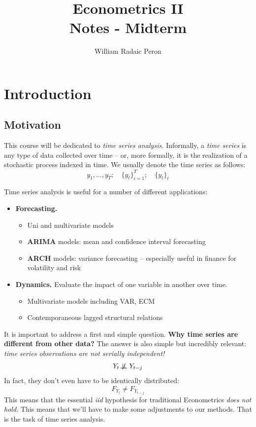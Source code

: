 \documentclass[11pt, a4paper]{report}
\title{\Huge \textbf{Econometrics II} \\ \LARGE Notes - Midterm}
\author{\Large William Radaic Peron}
\affil{\Large EESP-FGV}
\newcommand{\nindep}{\not\!\perp\!\!\!\perp}
\theoremstyle{plain}
\theoremstyle{plain}
\theoremstyle{remark}
\begin{document}
\setlength{\parindent}{0em}
\maketitle

\tableofcontents

\chapter{Introduction}

\section{Motivation}

This course will be dedicated to \textit{time series analysis.} Informally, a \textit{time series} is any type of data collected over time -- or, more formally, it is the realization of a stochastic process indexed in time. We usually denote the time series as follows: 
$$ y_1, ..., y_T; \hspace{1em} \{y_t\}_{i=1}^T; \hspace{1em} \{y_t\}_t $$

Time series analysis is useful for a number of different applications: 
\begin{itemize}
	\item \textbf{Forecasting.} \begin{itemize}
		\item Uni and multivariate models 
		\item \textbf{ARIMA} models: mean and confidence interval forecasting
		\item \textbf{ARCH} models: variance forecasting -- especially useful in finance for volatility and risk
	\end{itemize}
	\item \textbf{Dynamics.} Evaluate the impact of one variable in another over time. \begin{itemize}
		\item Multivariate models including VAR, ECM
		\item Contemporaneous lagged structural relations
	\end{itemize}
\end{itemize}

It is important to address a first and simple question. \textbf{Why time series are different from other data?} The answer is also simple but incredibly relevant: \textit{time series observations are not serially independent!}
$$ Y_t \nindep Y_{t-j} $$
In fact, they don't even have to be identically distributed:
$$ F_{Y_t} \neq F_{Y_{t-j}} $$
This means that the essential \textit{iid} hypothesis for traditional Econometrics \textit{does not hold.} This means that we'll have to make some adjustments to our methods. That is the task of time series analysis.
\end{document}
